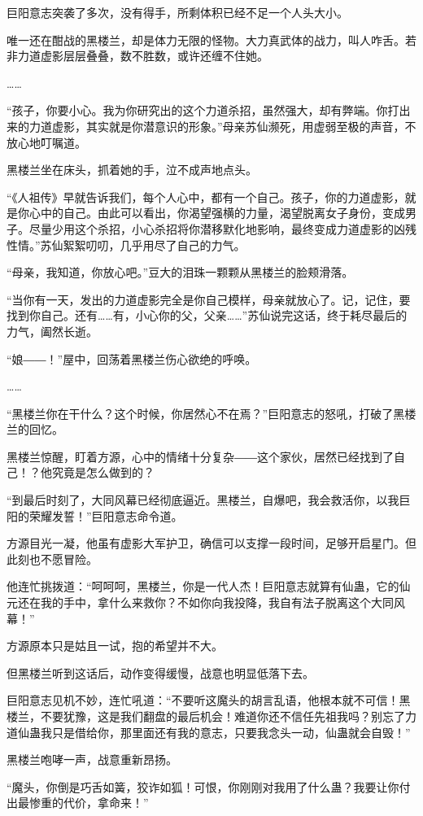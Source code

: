 \begin{this_body}
巨阳意志突袭了多次，没有得手，所剩体积已经不足一个人头大小。

唯一还在酣战的黑楼兰，却是体力无限的怪物。大力真武体的战力，叫人咋舌。若非力道虚影层层叠叠，数不胜数，或许还缠不住她。

……

“孩子，你要小心。我为你研究出的这个力道杀招，虽然强大，却有弊端。你打出来的力道虚影，其实就是你潜意识的形象。”母亲苏仙濒死，用虚弱至极的声音，不放心地叮嘱道。

黑楼兰坐在床头，抓着她的手，泣不成声地点头。

“《人祖传》早就告诉我们，每个人心中，都有一个自己。孩子，你的力道虚影，就是你心中的自己。由此可以看出，你渴望强横的力量，渴望脱离女子身份，变成男子。尽量少用这个杀招，小心杀招将你潜移默化地影响，最终变成力道虚影的凶残性情。”苏仙絮絮叨叨，几乎用尽了自己的力气。

“母亲，我知道，你放心吧。”豆大的泪珠一颗颗从黑楼兰的脸颊滑落。

“当你有一天，发出的力道虚影完全是你自己模样，母亲就放心了。记，记住，要找到你自己。还有……有，小心你的父，父亲……”苏仙说完这话，终于耗尽最后的力气，阖然长逝。

“娘――！”屋中，回荡着黑楼兰伤心欲绝的呼唤。

……

“黑楼兰你在干什么？这个时候，你居然心不在焉？”巨阳意志的怒吼，打破了黑楼兰的回忆。

黑楼兰惊醒，盯着方源，心中的情绪十分复杂――这个家伙，居然已经找到了自己！？他究竟是怎么做到的？

“到最后时刻了，大同风幕已经彻底逼近。黑楼兰，自爆吧，我会救活你，以我巨阳的荣耀发誓！”巨阳意志命令道。

方源目光一凝，他虽有虚影大军护卫，确信可以支撑一段时间，足够开启星门。但此刻也不愿冒险。

他连忙挑拨道：“呵呵呵，黑楼兰，你是一代人杰！巨阳意志就算有仙蛊，它的仙元还在我的手中，拿什么来救你？不如你向我投降，我自有法子脱离这个大同风幕！”

方源原本只是姑且一试，抱的希望并不大。

但黑楼兰听到这话后，动作变得缓慢，战意也明显低落下去。

巨阳意志见机不妙，连忙吼道：“不要听这魔头的胡言乱语，他根本就不可信！黑楼兰，不要犹豫，这是我们翻盘的最后机会！难道你还不信任先祖我吗？别忘了力道仙蛊我只是借给你，那里面还有我的意志，只要我念头一动，仙蛊就会自毁！”

黑楼兰咆哮一声，战意重新昂扬。

“魔头，你倒是巧舌如簧，狡诈如狐！可恨，你刚刚对我用了什么蛊？我要让你付出最惨重的代价，拿命来！”


\end{this_body}
